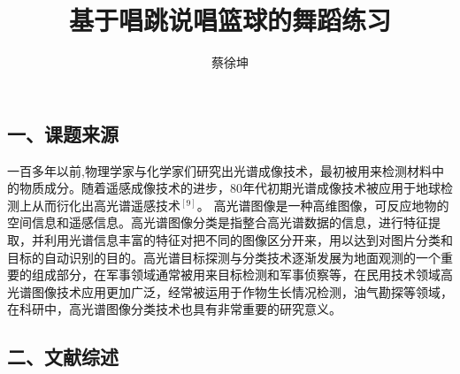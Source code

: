 \documentclass[UTF8,zihao=-4]{oucart}
\title{基于唱跳说唱篮球的舞蹈练习}
\author{蔡徐坤}
\begin{document}
    \makecoveror

    \newpage

    \setcounter{page}{1}

    \subsection*{一、课题来源}

    \begin{framed}

        一百多年以前,物理学家与化学家们研究出光谱成像技术，最初被用来检测材料中的物质成分。随着遥感成像技术的进步，80年代初期光谱成像技术被应用于地球检测上从而衍化出高光谱遥感技术$^{[9]}$。 高光谱图像是一种高维图像，可反应地物的空间信息和遥感信息。高光谱图像分类是指整合高光谱数据的信息，进行特征提取，并利用光谱信息丰富的特征对把不同的图像区分开来，用以达到对图片分类和目标的自动识别的目的。高光谱目标探测与分类技术逐渐发展为地面观测的一个重要的组成部分，在军事领域通常被用来目标检测和军事侦察等，在民用技术领域高光谱图像技术应用更加广泛，经常被运用于作物生长情况检测，油气勘探等领域，在科研中，高光谱图像分类技术也具有非常重要的研究意义。

    \end{framed}

    \subsection*{二、文献综述}
\end{document}
